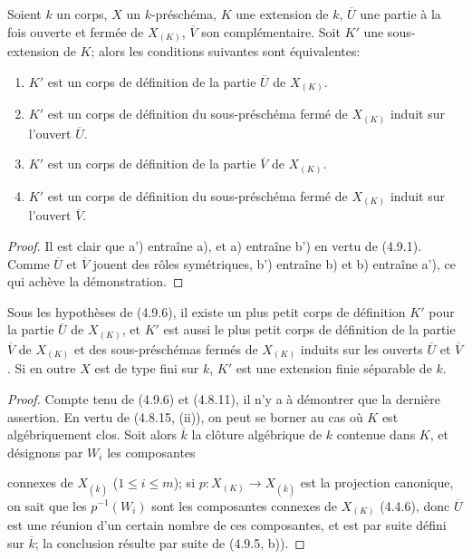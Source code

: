 \begin{proposition}[4.9.6]
\label{IV.2.4.9.6-fr}
Soient $k$ un corps, $X$ un $k$-préschéma, $K$ une extension de $k$,
$\overline U$ une partie à la fois ouverte et fermée de $X_{(K)}$,
$\overline V$ son complémentaire. Soit $K'$ une sous-extension de $K$;
alors les conditions suivantes sont équivalentes:
\begin{enumerate}
\item[a)] $K'$ est un corps de définition de la partie $\overline U$ de
$X_{(K)}$.
\item[a')] $K'$ est un corps de définition du sous-préschéma fermé de
$X_{(K)}$ induit sur l'ouvert $\overline U$.
\item[b)] $K'$ est un corps de définition de la partie $\overline V$ de
$X_{(K)}$.
\item[b')] $K'$ est un corps de définition du sous-préschéma fermé de
$X_{(K)}$ induit sur l'ouvert $\overline V$.
\end{enumerate}
\end{proposition}

\begin{proof}
Il est clair que a') entraîne a), et a) entraîne b') en vertu de (4.9.1).
Comme $\overline U$ et $\overline V$ jouent des rôles symétriques, b')
entraîne b) et b) entraîne a'), ce qui achève la démonstration.
\end{proof}

\begin{corollary}[4.9.7]
\label{IV.2.4.9.7-fr}
Sous les hypothèses de (4.9.6), il existe un plus petit corps de définition
$K'$ pour la partie $\overline U$ de $X_{(K)}$, et $K'$ est aussi le plus
petit corps de définition de la partie $\overline V$ de $X_{(K)}$ et des
sous-préschémas fermés de $X_{(K)}$ induits sur les ouverts $\overline U$ et
$\overline V$. Si en outre $X$ est de type fini sur $k$, $K'$ est une
extension finie séparable de $k$.
\end{corollary}

\begin{proof}
Compte tenu de (4.9.6) et (4.8.11), il n'y a à démontrer que la dernière
assertion. En vertu de (4.8.15, (ii)), on peut se borner au cas où $K$ est
algébriquement clos. Soit alors $\overline k$ la clôture algébrique de $k$
contenue dans $K$, et désignons par $W_i$ les composantes


connexes de $X_{(\overline k)}$ ($1\leq i\leq m$); si
$p:X_{(K)}\to X_{(\overline k)}$ est la projection canonique, on sait que les
$p^{-1}(W_i)$ sont les composantes connexes de $X_{(K)}$ (4.4.6), donc
$\overline U$ est une réunion d'un certain nombre de ces composantes, et est
par suite défini sur $\overline k$; la conclusion résulte par suite de
(4.9.5, b)).
\end{proof}
